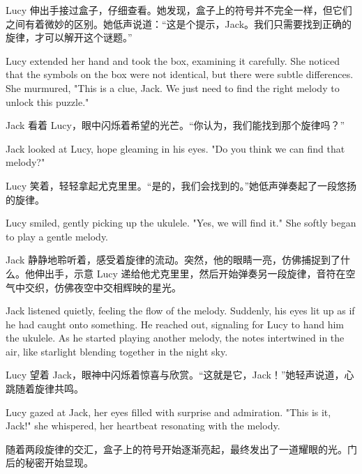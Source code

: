 Lucy 伸出手接过盒子，仔细查看。她发现，盒子上的符号并不完全一样，但它们之间有着微妙的区别。她低声说道：“这是个提示，Jack。我们只需要找到正确的旋律，才可以解开这个谜题。”

\begin{flushright}
Lucy extended her hand and took the box, examining it carefully. She noticed that the symbols on the box were not identical, but there were subtle differences. She murmured, "This is a clue, Jack. We just need to find the right melody to unlock this puzzle."
\end{flushright}

Jack 看着 Lucy，眼中闪烁着希望的光芒。“你认为，我们能找到那个旋律吗？”

\begin{flushright}
Jack looked at Lucy, hope gleaming in his eyes. "Do you think we can find that melody?"
\end{flushright}

Lucy 笑着，轻轻拿起尤克里里。“是的，我们会找到的。”她低声弹奏起了一段悠扬的旋律。

\begin{flushright} Lucy smiled, gently picking up the ukulele. "Yes, we will find it." She softly began to play a gentle melody. \end{flushright}

Jack 静静地聆听着，感受着旋律的流动。突然，他的眼睛一亮，仿佛捕捉到了什么。他伸出手，示意 Lucy 递给他尤克里里，然后开始弹奏另一段旋律，音符在空气中交织，仿佛夜空中交相辉映的星光。

\begin{flushright} Jack listened quietly, feeling the flow of the melody. Suddenly, his eyes lit up as if he had caught onto something. He reached out, signaling for Lucy to hand him the ukulele. As he started playing another melody, the notes intertwined in the air, like starlight blending together in the night sky. \end{flushright}

Lucy 望着 Jack，眼神中闪烁着惊喜与欣赏。“这就是它，Jack！”她轻声说道，心跳随着旋律共鸣。

\begin{flushright} Lucy gazed at Jack, her eyes filled with surprise and admiration. "This is it, Jack!" she whispered, her heartbeat resonating with the melody. \end{flushright}

随着两段旋律的交汇，盒子上的符号开始逐渐亮起，最终发出了一道耀眼的光。门后的秘密开始显现。

